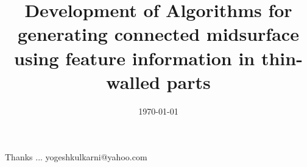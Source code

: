\documentclass[t,pdf,handout]{beamer}
\title[Pre-Synopsis\hspace{4cm} \insertframenumber /\inserttotalframenumber]
{Development of Algorithms for generating connected midsurface using feature information in thin-walled parts}
\subtitle[]{}
\date[2014]{\today}
\begin{document}
\begin{frame}
\titlepage
\end{frame}




\begin{frame}[c]{}
Thanks ...
\vspace{5mm}
yogeshkulkarni@yahoo.com
\end{frame}
\end{document}
